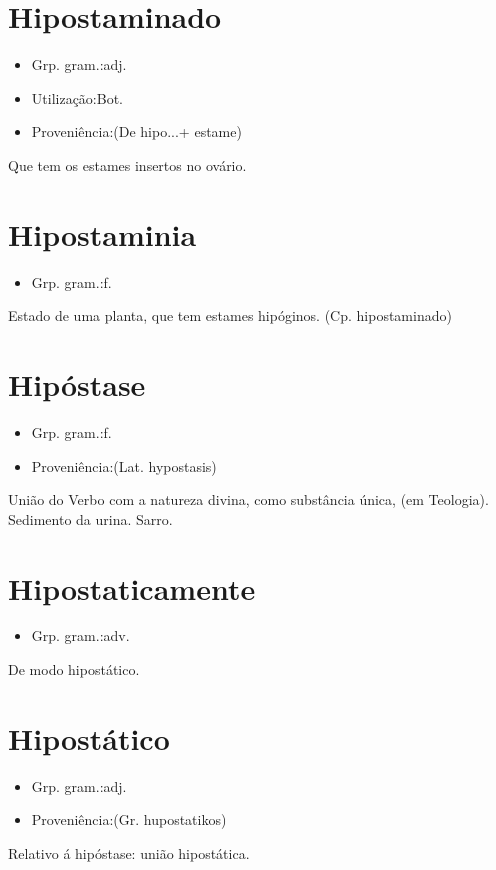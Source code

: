\documentclass{article}
\begin{document}
\section{Hipostaminado}
\begin{itemize}
\item {Grp. gram.:adj.}
\end{itemize}
\begin{itemize}
\item {Utilização:Bot.}
\end{itemize}
\begin{itemize}
\item {Proveniência:(De \textunderscore hipo...\textunderscore  + \textunderscore estame\textunderscore )}
\end{itemize}
Que tem os estames insertos no ovário.
\section{Hipostaminia}
\begin{itemize}
\item {Grp. gram.:f.}
\end{itemize}
Estado de uma planta, que tem estames hipóginos.
(Cp. \textunderscore hipostaminado\textunderscore )
\section{Hipóstase}
\begin{itemize}
\item {Grp. gram.:f.}
\end{itemize}
\begin{itemize}
\item {Proveniência:(Lat. \textunderscore hypostasis\textunderscore )}
\end{itemize}
União do Verbo com a natureza divina, como substância única, (em Teologia).
Sedimento da urina.
Sarro.
\section{Hipostaticamente}
\begin{itemize}
\item {Grp. gram.:adv.}
\end{itemize}
De modo hipostático.
\section{Hipostático}
\begin{itemize}
\item {Grp. gram.:adj.}
\end{itemize}
\begin{itemize}
\item {Proveniência:(Gr. \textunderscore hupostatikos\textunderscore )}
\end{itemize}
Relativo á hipóstase: \textunderscore união hipostática\textunderscore .
\end{document}
